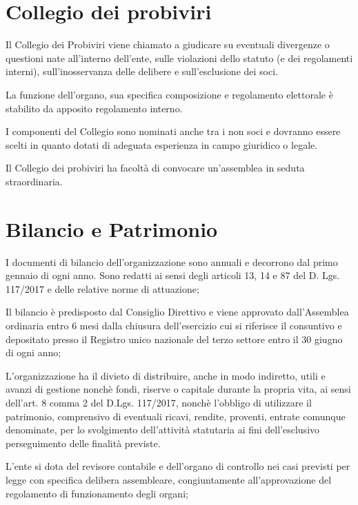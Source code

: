 \documentclass[legalpaper, 11pt]{exam}
\let\tempone\enumerate
\let\temptwo\endenumerate
\renewenvironment{enumerate}{\tempone\addtolength{\itemsep}{-0.45\baselineskip}}{\temptwo}
\begin{document}
\section{Collegio dei probiviri}
\begin{enumerate}
 \item Il Collegio dei Probiviri viene chiamato a giudicare su eventuali divergenze o questioni nate all’interno dell’ente, sulle violazioni dello statuto (e dei regolamenti interni), sull’inosservanza delle delibere e sull’esclusione dei soci.
 \item La funzione dell'organo, sua specifica composizione e regolamento elettorale è stabilito da apposito regolamento interno.
 \item I componenti del Collegio sono nominati anche tra i non soci e dovranno essere scelti in quanto dotati di adeguata esperienza in campo giuridico o legale.
 \item Il Collegio dei probiviri ha facoltà di convocare un'assemblea in seduta straordinaria.
\end{enumerate}

\section{Bilancio e Patrimonio}
\begin{enumerate}
 \item I documenti di bilancio dell'organizzazione sono annuali e decorrono dal primo gennaio di ogni anno. Sono redatti ai sensi degli articoli 13, 14 e 87 del D. Lgs. 117/2017 e delle relative norme di attuazione;
 \item Il bilancio è predisposto dal Consiglio Direttivo e viene approvato dall'Assemblea ordinaria entro 6 mesi dalla chiusura dell'esercizio cui si riferisce il consuntivo e depositato presso il Registro unico nazionale del terzo settore entro il 30 giugno di ogni anno;
 \item L'organizzazione ha il divieto di distribuire, anche in modo indiretto, utili e avanzi di gestione nonchè fondi, riserve o capitale durante la propria vita, ai sensi dell'art. 8 comma 2 del D.Lgs. 117/2017, nonchè l'obbligo di utilizzare il patrimonio, comprensivo di eventuali ricavi, rendite, proventi, entrate comunque denominate, per lo svolgimento dell'attività statutaria ai fini dell'esclusivo perseguimento delle finalità previste.
 \item L'ente si dota del revisore contabile e dell'organo di controllo nei casi previsti per legge con specifica delibera assembleare, congiuntamente all'approvazione del regolamento di funzionamento degli organi;
 
\end{enumerate}
\end{document}
